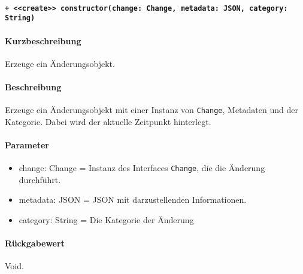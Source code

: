 \paragraph{\texttt{+ <<create>> constructor(change: Change, metadata: JSON, category: String)}}\label{AP_ChangeAction_constructor}%
\paragraph*{Kurzbeschreibung}
Erzeuge ein Änderungsobjekt.
\paragraph*{Beschreibung}
Erzeuge ein Änderungsobjekt mit einer Instanz von \verb#Change#, Metadaten und der Kategorie.
Dabei wird der aktuelle Zeitpunkt hinterlegt.
\paragraph*{Parameter}
\begin{itemize}
    \item change: Change = Instanz des Interfaces \verb#Change#, die die Änderung durchführt.
    \item metadata: JSON = JSON mit darzustellenden Informationen.
    \item category: String = Die Kategorie der Änderung
\end{itemize}
\paragraph*{Rückgabewert}
Void.